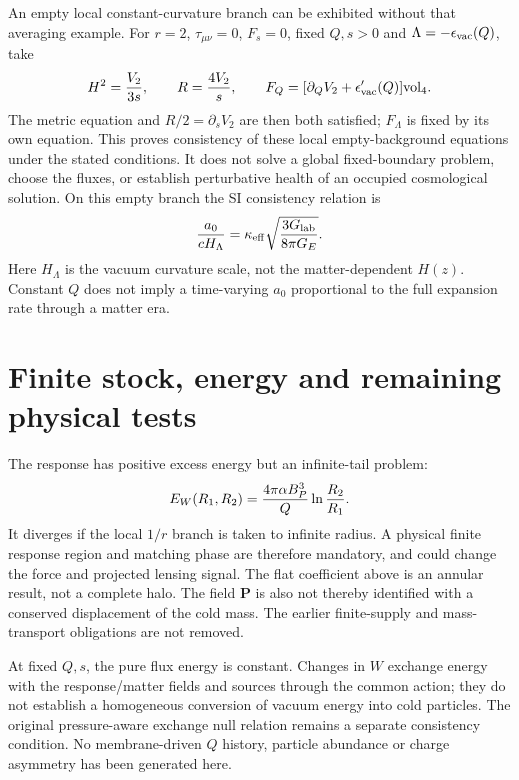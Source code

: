 \documentclass[11pt]{article}
\begin{document}
An empty local constant-curvature branch can be exhibited without that
averaging example. For $r=2$, $\tau_{\mu\nu}=0$, $F_s=0$, fixed
$Q,s>0$ and $\Lambda=-\epsilon_{\rm vac}(Q)$, take
\begin{equation}
 H^2={V_2\over3s},\qquad R={4V_2\over s},\qquad
 F_Q=[\partial_QV_2+\epsilon_{\rm vac}'(Q)]\mathrm{vol}_4.
\end{equation}
The metric equation and $R/2=\partial_sV_2$ are then both satisfied;
$F_\Lambda$ is fixed by its own equation. This proves consistency of
these local empty-background equations under the stated conditions. It
does not solve a global fixed-boundary problem, choose the fluxes, or
establish perturbative health of an occupied cosmological solution.
On this empty branch the SI consistency relation is
\begin{equation}
 {a_0\over cH_\Lambda}
   =\kappa_{\rm eff}\sqrt{{3G_{\rm lab}\over8\pi G_E}}.
\end{equation}
Here $H_\Lambda$ is the vacuum curvature scale, not the matter-dependent
$H(z)$. Constant $Q$ does not imply a time-varying $a_0$ proportional to
the full expansion rate through a matter era.

\section{Finite stock, energy and remaining physical tests}
The response has positive excess energy but an infinite-tail problem:
\begin{equation}
 E_W(R_1,R_2)={4\pi\alpha B_P^3\over Q}
                         \ln{R_2\over R_1}.
\end{equation}
It diverges if the local $1/r$ branch is taken to infinite radius.
A physical finite response region and matching phase are therefore
mandatory, and could change the force and projected lensing signal.
The flat coefficient above is an annular result, not a complete halo.
The field $\mathbf P$ is also not thereby identified with a conserved
displacement of the cold mass. The earlier finite-supply and mass-transport
obligations are not removed.

At fixed $Q,s$, the pure flux energy is constant. Changes in $W$ exchange
energy with the response/matter fields and sources through the common
action; they do not establish a homogeneous conversion of vacuum energy
into cold particles. The original pressure-aware exchange null relation
remains a separate consistency condition. No membrane-driven $Q$ history,
particle abundance or charge asymmetry has been generated here.
\end{document}
